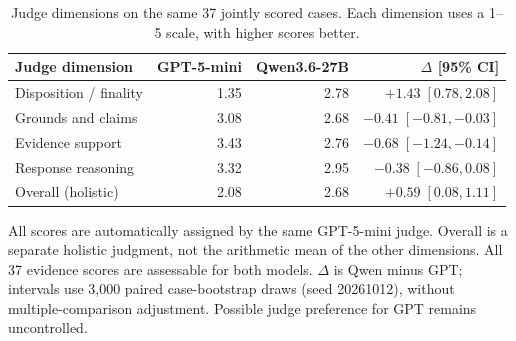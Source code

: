 \begin{table}[t]
\centering
\small
\setlength{\tabcolsep}{6pt}
\renewcommand{\arraystretch}{1.14}
\begin{tabular}{lrrr}
\toprule
Judge dimension & GPT-5-mini & Qwen3.6-27B & $\Delta$ [95\% CI] \\
\midrule
Disposition / finality & 1.35 & 2.78 & $+1.43\;[0.78, 2.08]$ \\
Grounds and claims & 3.08 & 2.68 & $-0.41\;[-0.81, -0.03]$ \\
Evidence support & 3.43 & 2.76 & $-0.68\;[-1.24, -0.14]$ \\
Response reasoning & 3.32 & 2.95 & $-0.38\;[-0.86, 0.08]$ \\
\midrule
Overall (holistic) & 2.08 & 2.68 & $+0.59\;[0.08, 1.11]$ \\
\bottomrule
\end{tabular}
\caption{Judge dimensions on the same 37 jointly scored cases. Each dimension uses a 1--5 scale, with higher scores better.}
\label{tab:cgen-t03}
\vspace{2pt}
\begin{minipage}{\textwidth}
\footnotesize All scores are automatically assigned by the same GPT-5-mini judge. Overall is a separate holistic judgment, not the arithmetic mean of the other dimensions. All 37 evidence scores are assessable for both models. $\Delta$ is Qwen minus GPT; intervals use 3,000 paired case-bootstrap draws (seed 20261012), without multiple-comparison adjustment. Possible judge preference for GPT remains uncontrolled.
\end{minipage}
\end{table}
